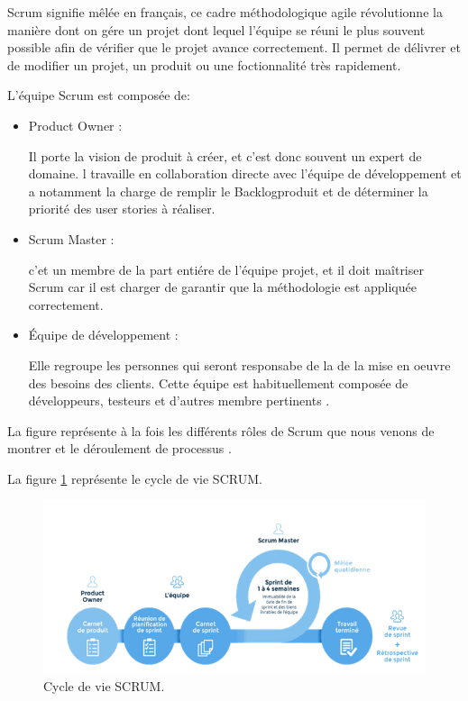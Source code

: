 \begin{itemize}[leftmargin=*,nosep]
Scrum signifie mêlée en français, ce cadre méthodologique agile révolutionne la manière dont on gére un projet dont lequel l'équipe se réuni le plus souvent possible afin de vérifier que le projet avance correctement. Il permet de délivrer et de modifier un projet, un produit ou une foctionnalité très rapidement. 

L'équipe Scrum est composée de:
\begin{itemize}
    \item 	Product Owner :

Il porte la vision de produit à créer, et c'est donc souvent un expert de domaine. l travaille en collaboration directe avec l’équipe de développement et a notamment la charge de remplir le Backlogproduit et de déterminer la priorité des user stories à réaliser.

      \item 	Scrum Master :

c'et un membre de la part entiére de l'équipe projet, et il doit maîtriser Scrum car il est charger de garantir que la méthodologie est appliquée correctement.

        \item Équipe de développement :

Elle regroupe les personnes qui seront responsabe de la de la mise en oeuvre des besoins des clients. Cette équipe est habituellement composée de développeurs, testeurs et d'autres membre pertinents .

\end{itemize}

La figure représente à la fois les différents  rôles de Scrum que nous venons de montrer et le déroulement de processus .

\label{sec:hotspot}
La figure \ref{fig:scrum} représente le cycle de vie SCRUM.
\begin{figure}[hbt!]
  \centering
  \includegraphics[width=17cm]{images_pfe/scrum.png}
  \caption{Cycle de vie SCRUM.}
  \label{fig:scrum}
\end{figure}
\FloatBarrier


\end{itemize}
